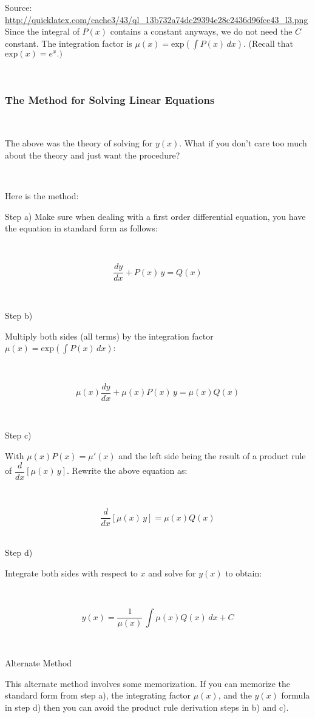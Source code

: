 \documentclass[]{article}
\begin{document}
Source:
\url{http://quicklatex.com/cache3/43/ql_13b732a74dc29394e28c2436d96fce43_l3.png}
Since the integral of \(P(x)\) contains a constant anyways, we do not
need the \(C\) constant. The integration factor is
\(\mu(x) = \text{exp}(\int P(x) \, dx)\). (Recall that
\(\text{exp}(x) = e^x.)\)

~

\subsubsection{The Method for Solving Linear
Equations}\label{the-method-for-solving-linear-equations}

~

The above was the theory of solving for \(y(x)\). What if you don't care
too much about the theory and just want the procedure?

~

Here is the method:

Step a) Make sure when dealing with a first order differential equation,
you have the equation in standard form as follows:

~

\[\displaystyle \dfrac{dy}{dx} + P(x) \, y = Q(x)\]

~

Step b)

Multiply both sides (all terms) by the integration factor
\(\mu(x) = \text{exp}(\int P(x) \, dx)\):

~

\[\displaystyle \mu(x) \dfrac{dy}{dx} + \mu(x) P(x) \, y = \mu(x) Q(x)\]

~

Step c)

With \(\mu(x) P(x) = \mu'(x)\) and the left side being the result of a
product rule of \(\dfrac{d}{dx}[ \mu(x) \, y]\). Rewrite the above
equation as:

~

\[\displaystyle \dfrac{d}{dx}[ \mu(x) \, y] = \mu(x) Q(x)\] ~

Step d)

Integrate both sides with respect to \(x\) and solve for \(y(x)\) to
obtain:

~

\[\displaystyle y(x) = \dfrac{1}{\mu(x)} \, \int \mu(x) Q(x) \, dx + C\]

~

Alternate Method

This alternate method involves some memorization. If you can memorize
the standard form from step a), the integrating factor \(\mu(x)\), and
the \(y(x)\) formula in step d) then you can avoid the product rule
derivation steps in b) and c).
\end{document}

